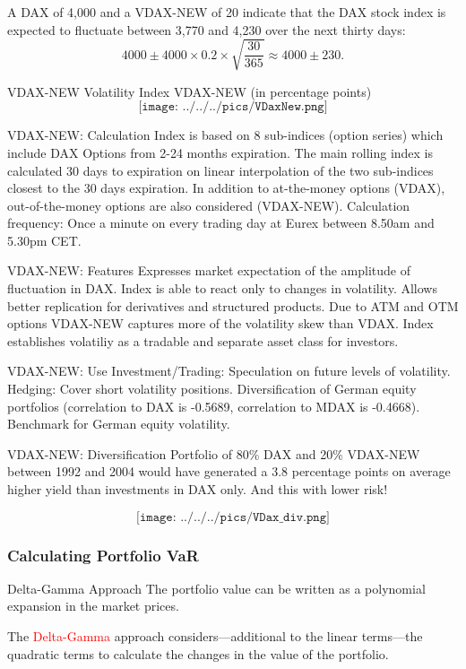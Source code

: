 		A DAX of 4,000 and a VDAX-NEW of 20 indicate that the DAX stock index is expected to fluctuate 
		between 3,770 and 4,230 over the next thirty days:
    $$4000\pm4000\times0.2\times\sqrt{\frac{30}{365}}\approx4000\pm230.$$


VDAX-NEW
	Volatility Index VDAX-NEW (in percentage points)
		$$\texttt{[image: ../../../pics/VDaxNew.png]}$$


VDAX-NEW: Calculation
	Index is based on 8 sub-indices (option series) which include DAX Options from 2-24 months expiration.
  The main rolling index is calculated 30 days to expiration on linear interpolation of the two sub-indices closest to the 30 days expiration.
  In addition to at-the-money options (VDAX), out-of-the-money options are also considered (VDAX-NEW).
  Calculation frequency: Once a minute on every trading day at Eurex between 8.50am and 5.30pm CET.


VDAX-NEW: Features
	Expresses market expectation of the amplitude of fluctuation in DAX.
  Index is able to react only to changes in volatility.
	Allows better replication for derivatives and structured products.
  Due to ATM and OTM options VDAX-NEW captures more of the volatility skew than VDAX.
  Index establishes volatiliy as a tradable and separate asset class for investors.


VDAX-NEW: Use
	Investment/Trading: Speculation on future levels of volatility.
  Hedging: Cover short volatility positions.
  Diversification of German equity portfolios (correlation to DAX is -0.5689, correlation to MDAX is -0.4668).
  Benchmark for German equity volatility.


VDAX-NEW: Diversification
	Portfolio of 80\% DAX and 20\% VDAX-NEW between
	1992 and 2004 would have generated a 3.8 percentage
	points on average higher yield than investments in
	DAX only. And this with lower risk!

	$$\texttt{[image: ../../../pics/VDax\_div.png]}$$


\subsubsection{Calculating Portfolio VaR}

Delta-Gamma Approach
	The portfolio value can be written as a polynomial expansion in the market prices.
	
	The \textcolor{red}{Delta-Gamma} approach considers---additional to	
	the linear terms---the quadratic terms to calculate the changes in the value of
	the portfolio.
	
